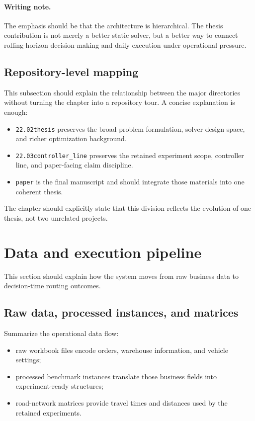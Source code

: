\paragraph{Writing note.}
The emphasis should be that the architecture is hierarchical. The thesis contribution is not merely a better static solver, but a better way to connect rolling-horizon decision-making and daily execution under operational pressure.

\subsection{Repository-level mapping}
\label{subsec:arch_repo_mapping}

This subsection should explain the relationship between the major directories without turning the chapter into a repository tour. A concise explanation is enough:
\begin{itemize}
    \item \texttt{22.02thesis} preserves the broad problem formulation, solver design space, and richer optimization background.
    \item \texttt{22.03controller_line} preserves the retained experiment scope, controller line, and paper-facing claim discipline.
    \item \texttt{paper} is the final manuscript and should integrate those materials into one coherent thesis.
\end{itemize}

The chapter should explicitly state that this division reflects the evolution of one thesis, not two unrelated projects.

\section{Data and execution pipeline}
\label{sec:arch_data_pipeline}

This section should explain how the system moves from raw business data to decision-time routing outcomes.

\subsection{Raw data, processed instances, and matrices}
\label{subsec:arch_data_sources}

Summarize the operational data flow:
\begin{itemize}
    \item raw workbook files encode orders, warehouse information, and vehicle settings;
    \item processed benchmark instances translate those business fields into experiment-ready structures;
    \item road-network matrices provide travel times and distances used by the retained experiments.
\end{itemize}

